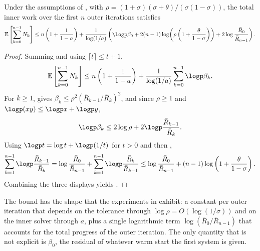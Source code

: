 \documentclass[11pt]{article}
\begin{document}
\begin{theorem}\label{thm:total-inner-work}
    Under the assumptions of , with $\rho = (1+\sigma)(\sigma+\theta)/(\sigma(1-\sigma))$, the total inner work over the first $n$ outer iterations satisfies
    \begin{equation}\label{eq:total-inner-work-estimate}
        \mathbb{E}\left[\sum_{k=0}^{n-1} N_k\right] \leq n\left(1 + \frac{1}{1-a}\right) + \frac{1}{\log(1/a)}\left(\logp\beta_0 + 2(n-1)\log\!\left(\rho\left(1 + \frac{\theta}{1-\sigma}\right)\right) + 2\log\frac{\bar{R}_{0}}{\bar{R}_{n-1}}\right).
    \end{equation}
\end{theorem}
\begin{proof}
    Summing  and using $\lceil t \rceil \leq t + 1$,
    \begin{equation*}
        \mathbb{E}\left[\sum_{k=0}^{n-1} N_k\right] \leq n\left(1 + \frac{1}{1-a}\right) + \frac{1}{\log(1/a)}\sum_{k=0}^{n-1}\logp\beta_k.
    \end{equation*}
    For $k \geq 1$,  gives $\beta_k \leq \rho^2 (\bar R_{k-1}/\bar R_k)^2$, and since $\rho \geq 1$ and $\logp(xy) \leq \logp x + \logp y$,
    \begin{equation*}
        \logp\beta_k \leq 2\log\rho + 2\logp\frac{\bar R_{k-1}}{\bar R_k}.
    \end{equation*}
    Using $\logp t = \log t + \logp(1/t)$ for $t > 0$ and then ,
    \begin{equation*}
        \sum_{k=1}^{n-1}\logp\frac{\bar R_{k-1}}{\bar R_k}
        = \log\frac{\bar R_0}{\bar R_{n-1}} + \sum_{k=1}^{n-1}\logp\frac{\bar R_{k}}{\bar R_{k-1}}
        \leq \log\frac{\bar R_0}{\bar R_{n-1}} + (n-1)\log\left(1 + \frac{\theta}{1-\sigma}\right).
    \end{equation*}
    Combining the three displays yields .
\end{proof}
The bound has the shape that the experiments in  exhibit: a constant per outer iteration that depends on the tolerance through $\log\rho = O(\log(1/\sigma))$ and on the inner solver through $a$, plus a single logarithmic term $\log(\bar R_0/\bar R_{n-1})$ that accounts for the total progress of the outer iteration.
The only quantity that is not explicit is $\beta_0$, the residual of whatever warm start the first system is given.
\end{document}
